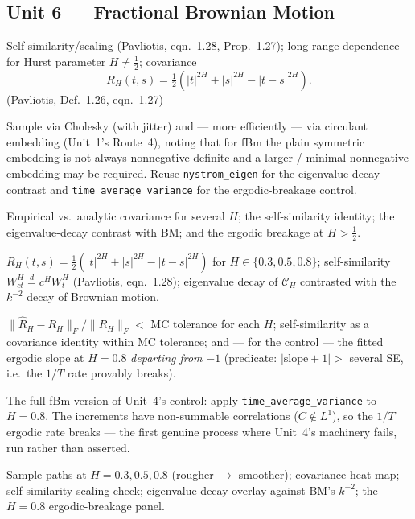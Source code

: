 \documentclass[11pt]{article}
\newcommand{\pav}[1]{{\small\color{hubblue}(Pavliotis, #1)}}
\newenvironment{unitmeta}{%
  \begin{description}[style=sameline,leftmargin=1.4cm,font=\bfseries\color{hubblue}]
}{%
  \end{description}
}
\begin{document}
\subsection*{Unit 6 --- Fractional Brownian Motion}
\begin{unitmeta}
\item[Concept] Self-similarity/scaling \pav{eqn.~1.28, Prop.~1.27}; long-range dependence for Hurst parameter $H\neq\tfrac12$; covariance
\begin{equation}
R_H(t,s) = \tfrac{1}{2}\left(|t|^{2H} + |s|^{2H} - |t-s|^{2H}\right).
\label{eq:fbm}
\end{equation}
\pav{Def.~1.26, eqn.~1.27}
\item[Build] Sample via Cholesky (with jitter) and --- more efficiently --- via circulant embedding (Unit~1's Route~4), noting that for fBm the plain symmetric embedding is not always nonnegative definite and a larger / minimal-nonnegative embedding may be required. Reuse \texttt{nystrom\_eigen} for the eigenvalue-decay contrast and \texttt{time\_average\_variance} for the ergodic-breakage control.
\item[Check] Empirical vs.\ analytic covariance for several $H$; the self-similarity identity; the eigenvalue-decay contrast with BM; and the ergodic breakage at $H>\tfrac12$.
\item[Analytic target] $R_H(t,s)=\tfrac12(|t|^{2H}+|s|^{2H}-|t-s|^{2H})$ for $H\in\{0.3,0.5,0.8\}$; self-similarity $W^H_{ct}\overset{d}{=}c^{H}W^H_t$ \pav{eqn.~1.28}; eigenvalue decay of $\mathcal{C}_H$ contrasted with the $k^{-2}$ decay of Brownian motion.
\item[Pass/fail] $\|\widehat R_H-R_H\|_F/\|R_H\|_F <$ MC tolerance for each $H$; self-similarity as a covariance identity within MC tolerance; and --- for the control --- the fitted ergodic slope at $H=0.8$ \emph{departing from} $-1$ (predicate: $|\text{slope}+1| > $ several SE, i.e.\ the $1/T$ rate provably breaks).
\item[Negative control] The full fBm version of Unit~4's control: apply \texttt{time\_average\_variance} to $H=0.8$. The increments have non-summable correlations ($C\notin L^1$), so the $1/T$ ergodic rate breaks --- the first genuine process where Unit~4's machinery fails, run rather than asserted.
\item[Artifact] Sample paths at $H=0.3,0.5,0.8$ (rougher $\to$ smoother); covariance heat-map; self-similarity scaling check; eigenvalue-decay overlay against BM's $k^{-2}$; the $H=0.8$ ergodic-breakage panel.

\end{unitmeta}
\end{document}
